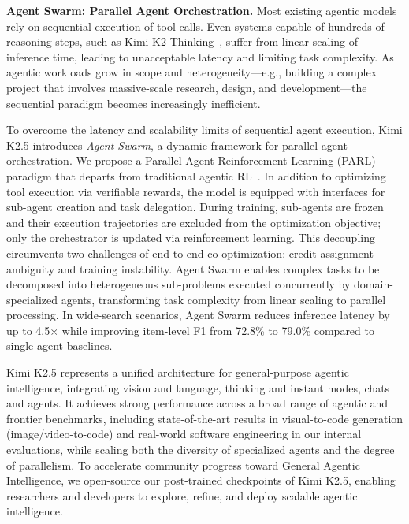 \textbf{Agent Swarm: Parallel Agent Orchestration.}
Most existing agentic models rely on sequential execution of tool calls. Even systems capable of hundreds of reasoning steps, such as Kimi K2-Thinking~\citep{moonshotai2025kimi}, suffer from linear scaling of inference time, leading to unacceptable latency and limiting task complexity. As agentic workloads grow in scope and heterogeneity—e.g., building a complex project that involves massive-scale research, design, and development—the sequential paradigm becomes increasingly inefficient.

To overcome the latency and scalability limits of sequential agent execution, Kimi K2.5 introduces \textit{Agent Swarm}, a dynamic framework for parallel agent orchestration. We propose a Parallel-Agent Reinforcement Learning (PARL) paradigm that departs from traditional agentic RL~\citep{moonshotai2025kimiresearcher}. In addition to optimizing tool execution via verifiable rewards, the model is equipped with interfaces for sub-agent creation and task delegation.  During training, sub-agents are frozen and their execution trajectories are excluded from the optimization objective; only the orchestrator is updated via reinforcement learning. This decoupling circumvents two challenges of end-to-end co-optimization: credit assignment ambiguity and training instability. Agent Swarm enables complex tasks to be decomposed into heterogeneous sub-problems executed concurrently by domain-specialized agents, transforming task complexity from linear scaling to parallel processing. In wide-search scenarios, Agent Swarm reduces inference latency by up to 4.5$\times$ while improving item-level F1 from 72.8\% to 79.0\% compared to single-agent baselines.

Kimi K2.5 represents a unified architecture for general-purpose agentic intelligence, integrating vision and language, thinking and instant modes, chats and agents. It achieves strong performance across a broad range of agentic and frontier benchmarks, including state-of-the-art results in visual-to-code generation (image/video-to-code) and real-world software engineering in our internal evaluations, while scaling both the diversity of specialized agents and the degree of parallelism. To accelerate community progress toward General Agentic Intelligence, we open-source our post-trained checkpoints of Kimi K2.5, enabling researchers and developers to explore, refine, and deploy scalable agentic intelligence.



